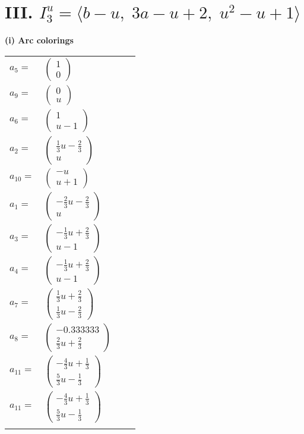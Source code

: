 \documentclass[1p]{elsarticle_modified}
\theoremstyle{definition}
\begin{document}
\centering \section*{III. $I^u_{3}= \langle b- u,\;3 a- u+2,\;u^2- u+1 \rangle$}
\flushleft \textbf{(i) Arc colorings}\\
\begin{tabular}{m{7pt} m{180pt} m{7pt} m{180pt} }
\flushright $a_{5}=$&$\begin{pmatrix}1\\0\end{pmatrix}$ \\
\flushright $a_{9}=$&$\begin{pmatrix}0\\u\end{pmatrix}$ \\
\flushright $a_{6}=$&$\begin{pmatrix}1\\u-1\end{pmatrix}$ \\
\flushright $a_{2}=$&$\begin{pmatrix}\frac{1}{3} u-\frac{2}{3}\\u\end{pmatrix}$ \\
\flushright $a_{10}=$&$\begin{pmatrix}- u\\u+1\end{pmatrix}$ \\
\flushright $a_{1}=$&$\begin{pmatrix}-\frac{2}{3} u-\frac{2}{3}\\u\end{pmatrix}$ \\
\flushright $a_{3}=$&$\begin{pmatrix}-\frac{1}{3} u+\frac{2}{3}\\u-1\end{pmatrix}$ \\
\flushright $a_{4}=$&$\begin{pmatrix}-\frac{1}{3} u+\frac{2}{3}\\u-1\end{pmatrix}$ \\
\flushright $a_{7}=$&$\begin{pmatrix}\frac{1}{3} u+\frac{2}{3}\\\frac{1}{3} u-\frac{2}{3}\end{pmatrix}$ \\
\flushright $a_{8}=$&$\begin{pmatrix}-0.333333\\\frac{2}{3} u+\frac{2}{3}\end{pmatrix}$ \\
\flushright $a_{11}=$&$\begin{pmatrix}-\frac{4}{3} u+\frac{1}{3}\\\frac{5}{3} u-\frac{1}{3}\end{pmatrix}$\\ \flushright $a_{11}=$&$\begin{pmatrix}-\frac{4}{3} u+\frac{1}{3}\\\frac{5}{3} u-\frac{1}{3}\end{pmatrix}$\\&\end{tabular}
\end{document}
